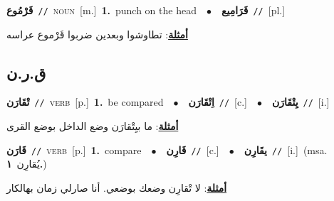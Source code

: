 \documentclass[10pt,a4paper,twoside]{article} %
\begin{document}
\begin{multicols}{2}
{\setlength\topsep{0pt}\textbf{\foreignlanguage{arabic}{قَرْمُوع}}\ {\color{gray}\texttt{//}\color{black}}\ \textsc{noun}\ [m.]\ \textbf{1.}~punch on the head\ \ $\bullet$\ \ \setlength\topsep{0pt}\textbf{\foreignlanguage{arabic}{قَرَامِيع}}\ {\color{gray}\texttt{//}\color{black}}\ [pl.]\  \begin{flushright}\color{gray}\foreignlanguage{arabic}{\textbf{\underline{\foreignlanguage{arabic}{أمثلة}}}: تطاوشوا وبعدين ضربوا قَرْموع عراسه}\end{flushright}\color{black}} \vspace{2mm}

\vspace{-3mm}
\subsection*{\color{blue}\foreignlanguage{arabic}{ق.ر.ن}\color{blue}{}} 

{\setlength\topsep{0pt}\textbf{\foreignlanguage{arabic}{تْقَارَن}}\ {\color{gray}\texttt{//}\color{black}}\ \textsc{verb}\ [p.]\ \textbf{1.}~be compared\ \ $\bullet$\ \ \setlength\topsep{0pt}\textbf{\foreignlanguage{arabic}{اِتْقَارَن}}\ {\color{gray}\texttt{//}\color{black}}\ [c.]\ \ $\bullet$\ \ \setlength\topsep{0pt}\textbf{\foreignlanguage{arabic}{يِتْقَارَن}}\ {\color{gray}\texttt{//}\color{black}}\ [i.]\  \begin{flushright}\color{gray}\foreignlanguage{arabic}{\textbf{\underline{\foreignlanguage{arabic}{أمثلة}}}: ما بيِتْقارَن وضع الداخل بوضع القرى}\end{flushright}\color{black}} \vspace{2mm}

{\setlength\topsep{0pt}\textbf{\foreignlanguage{arabic}{قَارَن}}\ {\color{gray}\texttt{//}\color{black}}\ \textsc{verb}\ [p.]\ \textbf{1.}~compare\ \ $\bullet$\ \ \setlength\topsep{0pt}\textbf{\foreignlanguage{arabic}{قَارِن}}\ {\color{gray}\texttt{//}\color{black}}\ [c.]\ \ $\bullet$\ \ \setlength\topsep{0pt}\textbf{\foreignlanguage{arabic}{يقَارِن}}\ {\color{gray}\texttt{//}\color{black}}\ [i.]\ \color{gray}(msa. \foreignlanguage{arabic}{يُقارِن}~\foreignlanguage{arabic}{\textbf{١.}})\color{black}\  \begin{flushright}\color{gray}\foreignlanguage{arabic}{\textbf{\underline{\foreignlanguage{arabic}{أمثلة}}}: لا تْقارِن وضعك بوضعي. أنا صارلي زمان بهالكار}\end{flushright}\color{black}} \vspace{2mm}


\end{multicols}
\end{document}

